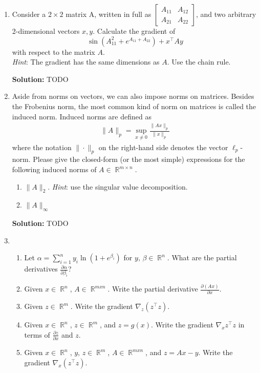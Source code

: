 \documentclass{article}
\DeclareMathOperator{\R}{\mathbb{R}}
\newenvironment{solution}{\color{blue} \smallskip \textbf{Solution:}}{}
\begin{document}
\begin{enumerate}

    \item 
    Consider a $2 \times 2$ matrix A, written in full as
    $\begin{bmatrix} A_{11} & A_{12} \\ A_{21} & A_{22} \end{bmatrix}$, and two arbitrary 2-dimensional vectors $x, y$.
    Calculate the gradient of
    \[\sin(A^2_{11}+e^{A_{11}+A_{22}}) + x^\top A y\]
    with respect to the matrix $A$. \\
    \emph{Hint}: The gradient has the same dimensions as $A$. Use the chain rule.
    
    \begin{solution}
        TODO
    \end{solution}

    \item 
    Aside from norms on vectors, we can also impose norms on matrices.
    Besides the Frobenius norm, the most common kind of norm on matrices is called the induced norm.
    Induced norms are defined as
    \begin{align*}
        \|A\|_{p} = \sup_{x \neq 0} \frac{\|Ax\|_p}{\|x\|_p}
    \end{align*}
    where the notation $\|\cdot\|_p$ on the right-hand side denotes the vector $\ell_p$-norm.
    Please give the closed-form (or the most simple) expressions for the following induced norms of $A \in \R^{m \times n}$.  
    \begin{enumerate}
        \item $\|A\|_{2}$. \emph{Hint}: use the singular value decomposition.
        \item $\|A\|_{\infty}$
    \end{enumerate}
    
    \begin{solution}
        TODO
    \end{solution}

    \item 
    \begin{enumerate}
        \item
        Let $\alpha = \sum\limits_{i=1}^n y_i \ln{(1 + e^{\beta_i})}$ for $y,\, \beta \in \R^n$.
        What are the partial derivatives $\frac{\partial \alpha}{\partial \beta_i}$?
        \item 
        Given $x \in \R^n$, $A \in \R^{mxn}$.
        Write the partial derivative $\frac{\partial (Ax)}{\partial x}$.
        \item
        Given $z \in \R^m$.
        Write the gradient $\nabla_z (z^\top z)$.
        \item
        Given $x \in \R^n$, $z \in \R^m$, and $z = g(x)$.
        Write the gradient $\nabla_x z^\top z$ in terms of $\frac{\partial z}{\partial x}$ and $z$.
        \item
        Given $x \in \R^n$, $y,\, z \in \R^m$, $A \in \R^{mxn}$, and $z = Ax - y$.
        Write the gradient $\nabla_x (z^\top z)$.
    \end{enumerate}
    

\end{enumerate}
\end{document}
